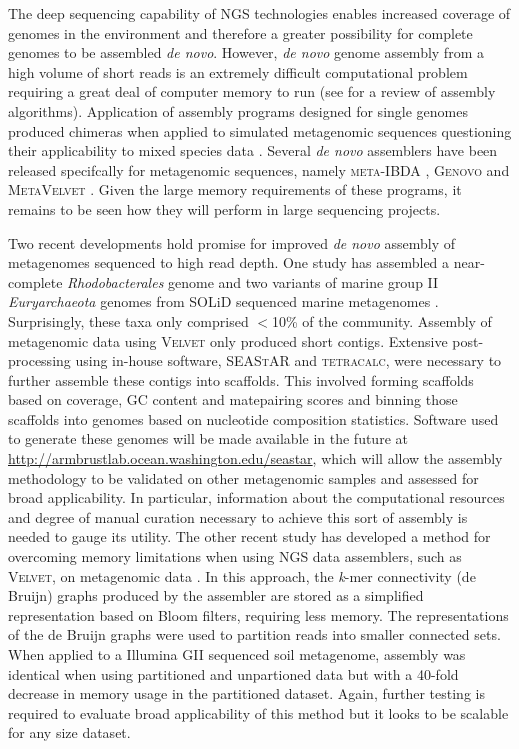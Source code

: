 The deep sequencing capability of \ac{NGS} technologies enables increased coverage of genomes in the environment and therefore a greater possibility for complete genomes to be assembled \emph{de novo}.
However, \emph{de novo} genome assembly from a high volume of short reads is an extremely difficult computational problem requiring a great deal of computer memory to run (see \citet{Salzberg2012} for a review of assembly algorithms).
Application of assembly programs designed for single genomes produced chimeras when applied to simulated metagenomic sequences questioning their applicability to mixed species data \cite{Pignatelli2011}.
Several \emph{de novo} assemblers have been released specifcally for metagenomic sequences, namely \textsc{meta-IBDA} \cite{Peng2011}, \textsc{Genovo} \cite{Laserson2011} and \textsc{MetaVelvet} \cite{Namiki2012}.
Given the large memory requirements of these programs, it remains to be seen how they will perform in large sequencing projects.

Two recent developments hold promise for improved \emph{de novo} assembly of metagenomes sequenced to high read depth.
One study has assembled a near-complete \emph{Rhodobacterales} genome and two variants of marine group II \emph{Euryarchaeota} genomes from SOLiD sequenced marine metagenomes \cite{Iverson2012}.
Surprisingly, these taxa only comprised $<$10\% of the community.
Assembly of metagenomic data using \textsc{Velvet} only produced short contigs.
Extensive post-processing using in-house software, \textsc{SEAStAR} and \textsc{tetracalc}, were necessary to further assemble these contigs into scaffolds.
This involved forming scaffolds based on coverage, GC content and matepairing scores and binning those scaffolds into genomes based on nucleotide composition statistics.
Software used to generate these genomes will be made available in the future at 
\url{http://armbrustlab.ocean.washington.edu/seastar},
which will allow the assembly methodology to be validated on other metagenomic samples and assessed for broad applicability.
In particular, information about the computational resources and degree of manual curation necessary to achieve this sort of assembly is needed to gauge its utility.
The other recent study has developed a method for overcoming memory limitations when using \ac{NGS} data assemblers, such as \textsc{Velvet}, on metagenomic data \cite{Pell2012}.
In this approach, the \emph{k}-mer connectivity (de Bruijn) graphs produced by the assembler are stored as a simplified representation based on Bloom filters, requiring less memory.
The representations of the de Bruijn graphs were used to partition reads into smaller connected sets.
When applied to a Illumina GII sequenced soil metagenome, assembly was identical when using partitioned and unpartioned data but with a 40-fold decrease in memory usage in the partitioned dataset.
Again, further testing is required to evaluate broad applicability of this method but it looks to be scalable for any size dataset.


